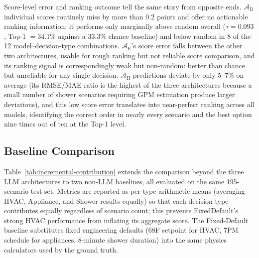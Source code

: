 \documentclass[a4paper,fleqn]{cas-dc}
\begin{document}
Score-level error and ranking outcome tell the same story from opposite ends. $\mathcal{A}_{\text{D}}$ individual scores routinely miss by more than 0.2 points and offer no actionable ranking information: it performs only marginally above random overall ($\tau = 0.093$, Top-1 $= 34.1\%$ against a $33.3\%$ chance baseline) and below random in 8 of the 12 model--decision-type combinations. $\mathcal{A}_{\text{E}}$'s score error falls between the other two architectures, usable for rough ranking but not reliable score comparison, and its ranking signal is correspondingly weak but non-random: better than chance but unreliable for any single decision. $\mathcal{A}_{\text{H}}$ predictions deviate by only 5--7\% on average (its RMSE/MAE ratio is the highest of the three architectures because a small number of shower scenarios requiring GPM estimation produce larger deviations), and this low score error translates into near-perfect ranking across all models, identifying the correct order in nearly every scenario and the best option nine times out of ten at the Top-1 level.

\FloatBarrier
\subsection{Baseline Comparison}
\label{sec:res-baselines}
Table~\ref{tab:incremental-contribution} extends the comparison beyond the three LLM architectures to two non-LLM baselines, all evaluated on the same 195-scenario test set. Metrics are reported as per-type arithmetic means (averaging HVAC, Appliance, and Shower results equally) so that each decision type contributes equally regardless of scenario count; this prevents FixedDefault's strong HVAC performance from inflating its aggregate score. The Fixed-Default baseline substitutes fixed engineering defaults (68\textdegree{}F setpoint for HVAC, 7PM schedule for appliances, 8-minute shower duration) into the same physics calculators used by the ground truth.
\end{document}

